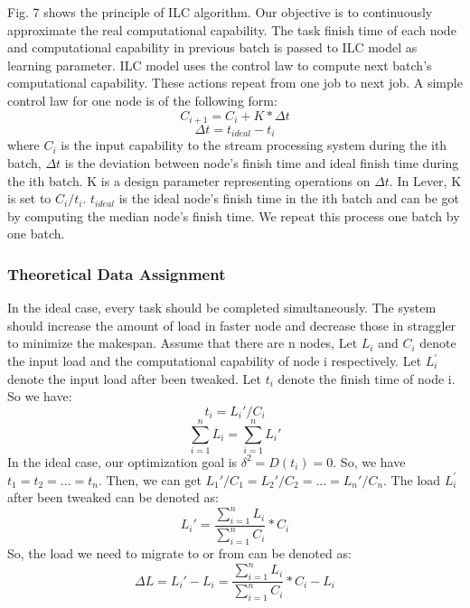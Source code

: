 \documentclass[10pt,conference,compsocconf,letterpaper]{IEEEtran}
\begin{document}
  Fig. 7 shows the principle of ILC algorithm. Our objective is to continuously approximate the real computational capability. The task finish time of each node and computational capability in previous batch is passed to ILC model as learning parameter. ILC model uses the control law to compute next batch's computational capability. These actions repeat from one job to next job. A simple control law for one node is of the following form:
  \begin{equation}
  C_{i+1} = C_i + K*\Delta t
  \end{equation}
   \begin{equation}
  \Delta t = t_{ideal} - t_{i}
  \end{equation}
  where $C_i$ is the input capability to the stream processing system during the ith batch, $\Delta t$ is the deviation between node's finish time and ideal finish time during the ith batch. K is a design parameter representing operations on $\Delta t$. In Lever, K is set to $C_i/t_i$. $t_{ideal}$ is the ideal node's finish time in the ith batch and can be got by computing the median node's finish time. We repeat this process one batch by one batch.

\subsubsection{Theoretical Data Assignment}

  In the ideal case, every task should be completed simultaneously. The system should increase the amount of load in faster node and decrease those in straggler to minimize the makespan. Assume that there are n nodes, Let \emph{$L_i$} and \emph{$C_i$} denote the input load and the computational capability of node i respectively. Let \emph{$L_i^\prime$} denote the input load after been tweaked. Let $t_i$ denote the finish time of node i. So we have:
  \begin{equation}
  t_i = L_i\prime / C_i
  \end{equation}
  \begin{equation}
  \sum_{i=1}^n L_i = \sum_{i=1}^n L_i\prime
  \end{equation}
  In the ideal case, our optimization goal is $\delta^{2}=D(t_i)=0$. So, we have $t_1=t_2=...=t_n$. Then, we can get $L_1\prime/C_1=L_2\prime/C_2=...=L_n\prime/C_n$. The load \emph{$L_i^\prime$} after been tweaked can be denoted as:
  \begin{equation}
  L_i\prime =  \frac{\sum_{i=1}^n L_i}{\sum_{i=1}^n C_i}*C_i
  \end{equation}
  So, the load we need to migrate to or from can be denoted as:
  \begin{equation}
  \Delta L = L_i\prime - L_i = \frac{\sum_{i=1}^n L_i}{\sum_{i=1}^n C_i}*C_i - L_i
  \end{equation}
\end{document}
